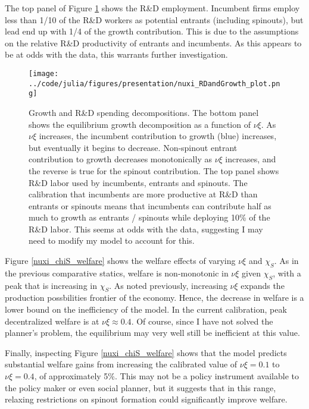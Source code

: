 \documentclass[12pt,english]{article}
\theoremstyle{remark}
\begin{document}
The top panel of Figure \ref{nuxi_growthDecomposition} shows the R\&D employment. Incumbent firms employ less than 1/10 of the R\&D workers as potential entrants (including spinouts), but lead end up with 1/4 of the growth contribution. This is due to the assumptions on the relative R\&D productivity of entrants and incumbents. As this appears to be at odds with the data, this warrants further investigation.

\begin{figure}[h] 
	\centering
	\texttt{[image: ../code/julia/figures/presentation/nuxi\_RDandGrowth\_plot.png]}
	\caption{Growth and R\&D spending decompositions. The bottom panel shows the equilibrium growth decomposition as a function of $\nu \xi$. As $\nu \xi$ increases, the incumbent contribution to growth (blue) increases, but eventually it begins to decrease. Non-spinout entrant contribution to growth decreases monotonically as $\nu \xi$ increases, and the reverse is true for the spinout contribution. The top panel shows R\&D labor used by incumbents, entrants and spinouts. The calibration that incumbents are more productive at R\&D than entrants or spinouts means that incumbents can contribute half as much to growth as entrants / spinouts while deploying 10\% of the R\&D labor. This seems at odds with the data, suggesting I may need to modify my model to account for this.}
	\label{nuxi_growthDecomposition}
\end{figure}

Figure \ref{nuxi_chiS_welfare} shows the welfare effects of varying $\nu \xi$ and $\chi_S$. As in the previous comparative statics, welfare is non-monotonic in $\nu \xi$ given $\chi_S$, with a peak that is increasing in $\chi_S$. As noted previously, increasing $\nu \xi$ expands the production possbilities frontier of the economy. Hence, the decrease in welfare is a lower bound on the inefficiency of the model. In the current calibration, peak decentralized welfare is at $\nu \xi \approx 0.4$. Of course, since I have not solved the planner's problem, the equilibrium may very well still be inefficient at this value. 

Finally, inspecting Figure \ref{nuxi_chiS_welfare} shows that the model predicts substantial welfare gains from increasing the calibrated value of $\nu \xi = 0.1$ to $\nu \xi = 0.4$, of approximately 5\%. This may not be a policy instrument available to the policy maker or even social planner, but it suggests that in this range, relaxing restrictions on spinout formation could significantly improve welfare. 





	
	
	
	
\end{document}
